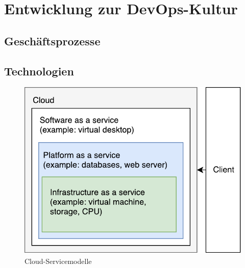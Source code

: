 \section{Entwicklung zur DevOps-Kultur}

\subsection{Geschäftsprozesse}

\subsection{Technologien}

\begin{figure}[h!]
	\centering
	\includegraphics[width=0.8\linewidth]{images/servicemodules.pdf}
	\caption{Cloud-Servicemodelle} %
	\label{fig:cnn_structure}
\end{figure}